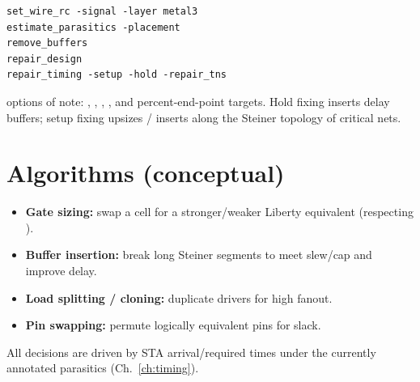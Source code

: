 \begin{lstlisting}[style=ortcl]
set_wire_rc -signal -layer metal3
estimate_parasitics -placement
remove_buffers
repair_design
repair_timing -setup -hold -repair_tns
\end{lstlisting}

 options of note: , ,
, , and percent-end-point targets.
Hold fixing inserts delay buffers; setup fixing upsizes / inserts along the
Steiner topology of critical nets.

\section{Algorithms (conceptual)}

\begin{itemize}
  \item \textbf{Gate sizing:} swap a cell for a stronger/weaker Liberty
        equivalent (respecting ).
  \item \textbf{Buffer insertion:} break long Steiner segments to meet slew/cap
        and improve delay.
  \item \textbf{Load splitting / cloning:} duplicate drivers for high fanout.
  \item \textbf{Pin swapping:} permute logically equivalent pins for slack.
\end{itemize}

All decisions are driven by STA arrival/required times under the currently
annotated parasitics (Ch.~\ref{ch:timing}).

